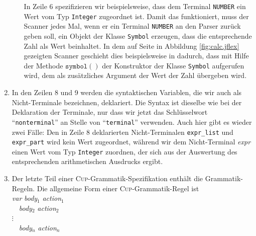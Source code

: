 \begin{enumerate}
\begin{enumerate}
            In Zeile 6 spezifizieren wir beispielsweise, dass dem Terminal \texttt{NUMBER} ein
            Wert vom Typ \texttt{Integer} zugeordnet ist.  Damit das funktioniert, muss der Scanner
            jedes Mal,
            wenn er ein Terminal \texttt{NUMBER} an den Parser zur\"uck geben soll, ein Objekt der
            Klasse  \texttt{Symbol} erzeugen, dass die entsprechende Zahl als Wert beinhaltet.
            In dem auf Seite \pageref{fig:calc.jflex}
            in Abbildung \ref{fig:calc.jflex} gezeigten Scanner geschieht dies beispielsweise
            in dadurch, dass mit Hilfe der Methode $\texttt{symbol}()$ der Konstruktor der
            Klasse \texttt{Symbol} aufgerufen wird, dem als zus\"atzliches Argument der Wert der Zahl
            \"ubergeben wird.
      \end{enumerate}
\item In den Zeilen 8 und 9 werden die syntaktischen Variablen, die wir auch als Nicht-Terminale
      bezeichnen, deklariert.  Die Syntax ist dieselbe wie bei der Deklaration der Terminale, nur
      dass wir jetzt das Schl\"usselwort ``\texttt{nonterminal}'' an Stelle von ``\texttt{terminal}''
      verwenden.  Auch hier gibt es wieder zwei F\"alle:  Den in Zeile 8 deklarierten Nicht-Terminalen
      \texttt{expr\_list} und \texttt{expr\_part} wird kein Wert zugeordnet, w\"ahrend wir dem
      Nicht-Terminal \textsl{expr} einen Wert vom Typ \texttt{Integer} zuordnen, der sich aus der
      Auswertung des entsprechenden arithmetischen Ausdrucks ergibt.
\item Der letzte Teil einer \textsc{Cup}-Grammatik-Spezifikation enth\"alt die Grammatik-Regeln. 
      Die allgemeine Form einer \textsc{Cup}-Grammatik-Regel ist
      \\[0.2cm]
      \hspace*{1.3cm}
      \textsl{var} \qote{::=} \textsl{body}$_1$ \qote{\{:} \textsl{action}$_1$ \qote{:\}} \\[0.1cm]
      \hspace*{2.05cm} \qote{|} \ \ \textsl{body}$_2$ \qote{\{:} \textsl{action}$_2$ \qote{:\}} \\[0.1cm]
      \hspace*{2.25cm} $\vdots$ \ \ \\[0.1cm]
      \hspace*{2.05cm} \qote{|} \ \ \textsl{body}$_n$ \qote{\{:} \textsl{action}$_n$ \qote{:\}}  \\[0.1cm]
      \hspace*{2.05cm} \qote{;} \\[0.1cm]

\end{enumerate}
